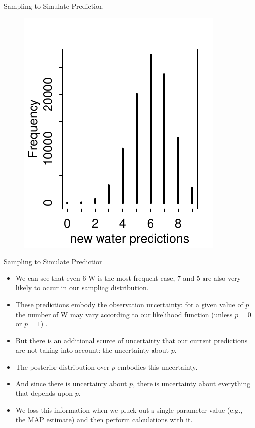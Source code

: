 \documentclass[handout]{beamer}
\begin{document}
\begin{frame}{Sampling to Simulate Prediction}
\scriptsize{

   \begin{figure}[h!]
	\centering
	\includegraphics{pics/w_predictions.pdf}
	\end{figure} 




} 

\end{frame}


\begin{frame}{Sampling to Simulate Prediction}
\scriptsize{

\begin{itemize}

\item We can see that even 6 W is the most frequent case, 7 and 5 are also very likely to occur in our sampling distribution.

\item These predictions embody the observation uncertainty: for a given value of $p$ the number of W may vary according to our likelihood function (unless $p=0$ or $p=1$) .

\item But there is an additional source of uncertainty that our current predictions are not taking into account: the uncertainty about $p$.

\item The posterior distribution over $p$ embodies this uncertainty.

\item And since there is uncertainty about $p$, there is uncertainty about everything that depends upon $p$.

\item We loss this information when we pluck out a single parameter value (e.g., the MAP estimate) and then perform calculations with it. 


\end{itemize}


} 
\end{frame}
\end{document}
